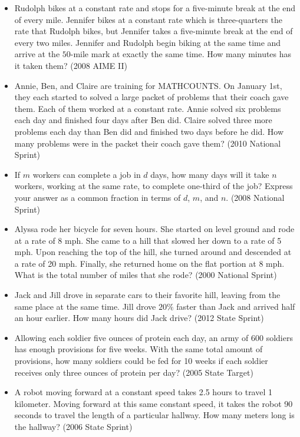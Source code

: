 \documentclass{article}
\begin{document}
\begin{itemize}
\item Rudolph bikes at a constant rate and stops for a five-minute break at the end of every mile. Jennifer bikes at a constant rate which is three-quarters the rate that Rudolph bikes, but Jennifer takes a five-minute break at the end of every two miles. Jennifer and Rudolph begin biking at the same time and arrive at the $50$-mile mark at exactly the same time. How many minutes has it taken them? (2008 AIME II)

\item Annie, Ben, and Claire are training for MATHCOUNTS. On January 1st, they each started to solved a large packet of problems that their coach gave them. Each of them worked at a constant rate. Annie solved six problems each day and finished four days after Ben did. Claire solved three more problems each day than Ben did and finished two days before he did. How many problems were in the packet their coach gave them? (2010 National Sprint)

\item If $m$ workers can complete a job in $d$ days, how many days will it take $n$ workers, working at the same rate, to complete one-third of the job? Express your answer as a common fraction in terms of $d$, $m$, and $n$. (2008 National Sprint)

\item Alyssa rode her bicycle for seven hours. She started on level ground and rode at a rate of 8 mph. She came to a hill that slowed her down to a rate of 5 mph. Upon reaching the top of the hill, she turned around and descended at a rate of 20 mph. Finally, she returned home on the flat portion at 8 mph. What is the total number of miles that she rode? (2000 National Sprint)

\item Jack and Jill drove in separate cars to their favorite hill, leaving from the same place at the same time. Jill drove $20\%$ faster than Jack and arrived half an hour earlier. How many hours did Jack drive? (2012 State Sprint) 

\item Allowing each soldier five ounces of protein each day, an army of 600 soldiers has enough provisions for five weeks. With the same total amount of provisions, how many soldiers could be fed for 10 weeks if each soldier receives only three ounces of protein per day? (2005 State Target)

\item A robot moving forward at a constant speed takes 2.5 hours to travel 1 kilometer. Moving forward at this same constant speed, it takes the robot 90 seconds to travel the length of a particular hallway. How many meters long is the hallway? (2006 State Sprint)


\end{itemize}
\end{document}
